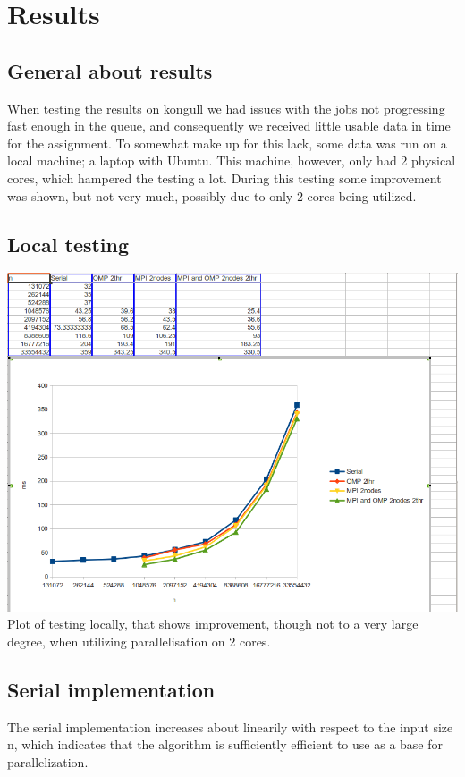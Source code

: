 \documentclass[fontsize=11pt,paper=a4,titlepage]{report}
\begin{document}
\section{Results}

\subsection{General about results}
When testing the results on kongull we had issues with the jobs not progressing fast enough in the queue, and consequently we received little usable data in time for the assignment.
To somewhat make up for this lack, some data was run on a local machine; a laptop with Ubuntu. This machine, however, only had 2 physical cores, which hampered the testing a lot. During this testing some improvement was shown, but not very much, possibly due to only 2 cores being utilized.

\subsection{Local testing}
\includegraphics[scale=0.6]{local_data_plot.png}
Plot of testing locally, that shows improvement, though not to a very large degree, when utilizing parallelisation on 2 cores.

\subsection{Serial implementation}
The serial implementation increases about linearily with respect to the input size n, which indicates that 
the algorithm is sufficiently efficient to use as a base for parallelization.
\end{document}

